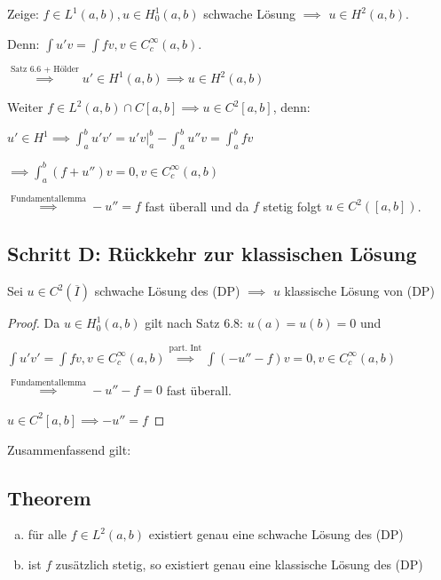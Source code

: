 Zeige: $f \in L^1(a,b), u \in H_0^1(a,b)$ schwache Lösung $\implies$ $u \in H^2(a,b)$.

Denn: $\int u' v = \int f v, v \in C_c^\infty(a,b)$.

$\overset{\text{Satz 6.6 + Hölder}}{\implies} u' \in H^1(a,b) \implies u \in H^2(a,b)$

Weiter $f \in L^2(a,b) \cap C[a,b] \implies u \in C^2[a,b]$, denn:

$u' \in H^1 \implies \int_a^b u' v' = u' v |_a^b - \int_a^b u'' v = \int_a^b fv$

$\implies \int_a^b (f + u'') v = 0, v \in C_c^\infty(a,b)$

$\overset{\text{Fundamentallemma}}{\implies} -u'' = f $ fast überall und da $f$ stetig folgt $u \in C^2([a,b])$.

\subsection*{Schritt D: Rückkehr zur klassischen Lösung}

Sei $u \in C^2(\overline I)$ schwache Lösung des (DP) $\implies$ $u$ klassische Lösung von (DP)

\begin{proof}
  Da $u \in H_0^1(a,b)$ gilt nach Satz 6.8: $u(a) = u(b) = 0$ und 

  $\int u' v' = \int fv, v \in C_c^\infty(a,b) \overset{\text{part. Int}}{\implies} \int (-u'' - f) v = 0, v \in C_c^\infty(a,b)$

  $\overset{\text{Fundamentallemma}}{\implies} -u'' - f = 0$ fast überall.

  $u \in C^2[a,b] \implies -u'' = f$
\end{proof}

Zusammenfassend gilt:

\subsection{Theorem}

\begin{enumerate}[a)]
  \item für alle $f \in L^2(a,b)$ existiert genau eine schwache Lösung des (DP)
  \item ist $f$ zusätzlich stetig, so existiert genau eine klassische Lösung des (DP)
\end{enumerate}
